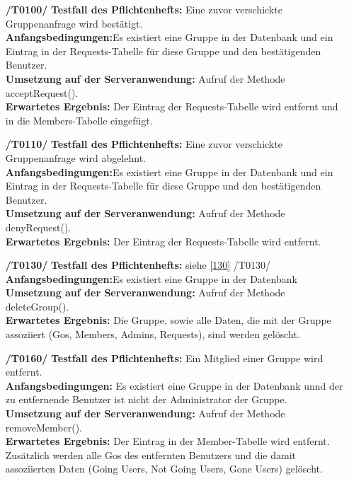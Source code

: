 \documentclass[11pt,a4paper]{scrartcl}
\begin{document}
\begin{enumerate}
	\item[\textbf{/T0100/}]
	\textbf{Testfall des Pflichtenhefts: }Eine zuvor verschickte Gruppenanfrage wird bestätigt.\\
	\textbf{Anfangsbedingungen:}Es existiert eine Gruppe in der Datenbank und ein Eintrag in der Requests-Tabelle für diese Gruppe und den bestätigenden Benutzer.\\
	\textbf{Umsetzung auf der Serveranwendung: }Aufruf der Methode acceptRequest().\\
	\textbf{Erwartetes Ergebnis: }Der Eintrag der Requests-Tabelle wird entfernt und in die Members-Tabelle eingefügt.
	
	\item[\textbf{/T0110/}]
	\textbf{Testfall des Pflichtenhefts: }Eine zuvor verschickte Gruppenanfrage wird abgelehnt.\\
	\textbf{Anfangsbedingungen:}Es existiert eine Gruppe in der Datenbank und ein Eintrag in der Requests-Tabelle für diese Gruppe und den bestätigenden Benutzer.\\
	\textbf{Umsetzung auf der Serveranwendung: }Aufruf der Methode denyRequest().\\
	\textbf{Erwartetes Ergebnis: }Der Eintrag der Requests-Tabelle wird entfernt.
	
	\item[\textbf{/T0130/}] \label{T130} 
	\textbf{Testfall des Pflichtenhefts: }siehe \ref{130} /T0130/\\
	\textbf{Anfangsbedingungen:}Es existiert eine Gruppe in der Datenbank\\
	\textbf{Umsetzung auf der Serveranwendung: }Aufruf der Methode deleteGroup().\\
	\textbf{Erwartetes Ergebnis: }Die Gruppe, sowie alle Daten, die mit der Gruppe assoziiert (Gos, Members, Admins, Requests), sind werden gelöscht.
	
	\item[\textbf{/T0160/}]
	\textbf{Testfall des Pflichtenhefts: }Ein Mitglied einer Gruppe wird entfernt.\\
	\textbf{Anfangsbedingungen: }Es existiert eine Gruppe in der Datenbank unnd der zu entfernende Benutzer ist nicht der Administrator der Gruppe.\\
	\textbf{Umsetzung auf der Serveranwendung: }Aufruf der Methode removeMember().\\
	\textbf{Erwartetes Ergebnis: }Der Eintrag in der Member-Tabelle wird entfernt. Zusätzlich werden alle Gos des entfernten Benutzers und die damit assoziierten Daten (Going Users, Not Going Users, Gone Users) gelöscht.
	

\end{enumerate}
\end{document}
